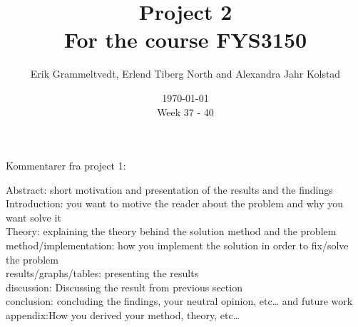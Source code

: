 \documentclass{article}
\begin{document}
\addtocounter{page}{0}

\title{Project 2 \\
      \large For the course FYS3150}
\date{\today \\
    \vspace{1mm}
    \large Week 37 - 40}

\author{Erik Grammeltvedt, Erlend Tiberg North and Alexandra Jahr Kolstad}

\maketitle


\vspace{1cm}

\tableofcontents

\vspace{1cm}


\newpage
\clearpage

Kommentarer fra project 1: 

Abstract: short motivation and presentation of the results and the findings \\

Introduction: you want to motive the reader about the problem and why you want solve it \\

Theory: explaining the theory behind the solution method and the problem \\

method/implementation: how you implement the solution in order to fix/solve the problem \\

results/graphs/tables: presenting the results \\

discussion: Discussing the result from previous section \\

conclusion: concluding the findings, your neutral opinion, etc… and future work \\

appendix:How you derived your method, theory, etc… \\

\vspace{2cm}
\end{document}
